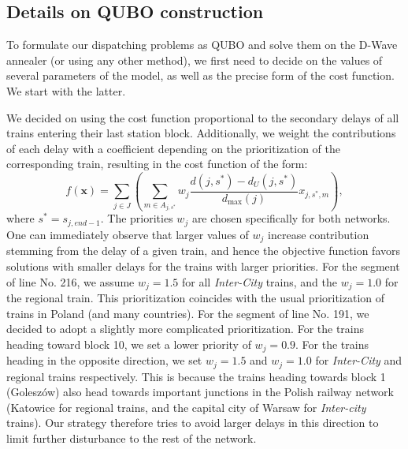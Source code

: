 \subsection{Details on QUBO construction}

To formulate our dispatching problems as QUBO and solve them on the D-Wave
annealer (or using any other method), we first need to decide on the values of
several parameters of the model, as well as the precise form of the cost
function. We start with the latter.

We decided on using the cost function proportional to the secondary delays of
all trains entering their last station block. Additionally, we weight the
contributions of each delay with a coefficient depending on the prioritization
of the corresponding train, resulting in the cost function of the form:
\begin{equation}
  f(\mathbf{x}) = \sum_{j \in J}\left(\sum_{m  \in A_{j,s^{*}}}w_{j} \frac{d(j,s^{*}) - d_{U}(j,s^{*})}{d_{\max}(j)}x_{j,s^{*},m}\right),
\end{equation}
where $s^{*} = s_{j,end-1}$. The priorities $w_{j}$ are chosen specifically for
both networks. One can immediately observe that larger values of $w_{j}$
increase contribution stemming from the delay of a given train, and hence the
objective function favors solutions with smaller delays for the trains with
larger priorities. For the segment of line No. 216, we assume $w_{j}= 1.5$ for
all \emph{Inter-City} trains, and the $w_{j}=1.0$ for the regional train. This
prioritization coincides with the usual prioritization of trains in Poland (and
many countries). For the segment of line No. 191, we decided to adopt a
slightly more complicated prioritization. For the trains heading toward block
10, we set a lower priority of $w_{j}=0.9$. For the trains heading in the
opposite direction, we set $w_{j}=1.5$ and $w_{j}=1.0$ for \emph{Inter-City}
and regional trains respectively. This is because the trains heading towards
block 1 (Goleszów) also head towards important junctions in the Polish railway
network (Katowice for regional trains, and the capital city of Warsaw for
\emph{Inter-city} trains). Our strategy therefore tries to avoid larger delays
in this direction to limit further disturbance to the rest of the network.

